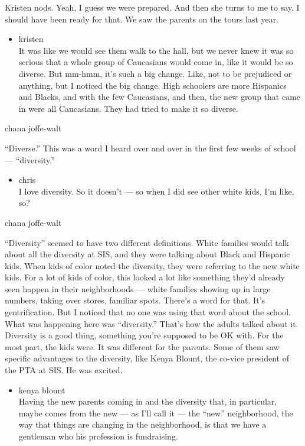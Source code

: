 Kristen nods. Yeah, I guess we were prepared. And then she turns to me
to say, I should have been ready for that. We saw the parents on the
tours last year.

\begin{itemize}
\tightlist
\item
  kristen\\
  It was like we would see them walk to the hall, but we never knew it
  was so serious that a whole group of Caucasians would come in, like it
  would be so diverse. But mm-hmm, it's such a big change. Like, not to
  be prejudiced or anything, but I noticed the big change. High
  schoolers are more Hispanics and Blacks, and with the few Caucasians,
  and then, the new group that came in were all Caucasians. They had
  tried to make it so diverse.
\end{itemize}

chana joffe-walt

``Diverse.'' This was a word I heard over and over in the first few
weeks of school --- ``diversity.''

\begin{itemize}
\tightlist
\item
  chris\\
  I love diversity. So it doesn't --- so when I did see other white
  kids, I'm like, so?
\end{itemize}

chana joffe-walt

``Diversity'' seemed to have two different definitions. White families
would talk about all the diversity at SIS, and they were talking about
Black and Hispanic kids. When kids of color noted the diversity, they
were referring to the new white kids. For a lot of kids of color, this
looked a lot like something they'd already seen happen in their
neighborhoods --- white families showing up in large numbers, taking
over stores, familiar spots. There's a word for that. It's
gentrification. But I noticed that no one was using that word about the
school. What was happening here was ``diversity.'' That's how the adults
talked about it. Diversity is a good thing, something you're supposed to
be OK with. For the most part, the kids were. It was different for the
parents. Some of them saw specific advantages to the diversity, like
Kenya Blount, the co-vice president of the PTA at SIS. He was excited.

\begin{itemize}
\tightlist
\item
  kenya blount\\
  Having the new parents coming in and the diversity that, in
  particular, maybe comes from the new --- as I'll call it --- the
  ``new'' neighborhood, the way that things are changing in the
  neighborhood, is that we have a gentleman who his profession is
  fundraising.
\end{itemize}

